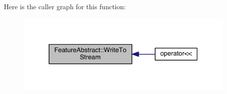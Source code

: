 Here is the caller graph for this function\+:\nopagebreak
\begin{figure}[H]
\begin{center}
\leavevmode
\includegraphics[width=309pt]{class_feature_abstract_a43cad67d17b3f23f1687862526126a1b_icgraph}
\end{center}
\end{figure}




